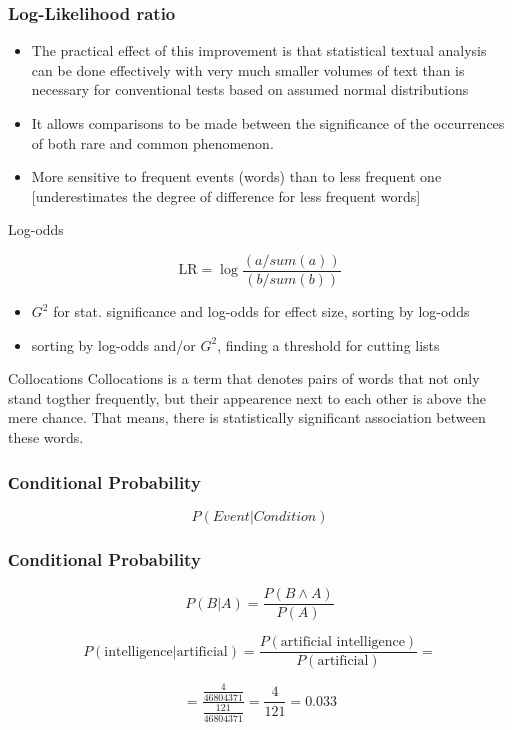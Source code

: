 \documentclass[svgnames]{beamer}
\begin{document}
\begin{frame}
  \frametitle{Log-Likelihood ratio}

  \begin{itemize}
    \item The practical effect of this improvement is that  statistical textual analysis can be done
  effectively with very much smaller volumes of text than is necessary for conventional tests based on assumed normal distributions
  \item It allows comparisons to be made between the significance of the occurrences of both rare and common phenomenon.
  \item More sensitive to frequent events (words) than to less frequent one [underestimates the degree of difference for less frequent words]
  \end{itemize}
\end{frame}

\begin{frame}{Log-odds}

  $$\text{LR} = \log\frac{(a/sum(a))}{(b/sum(b))}$$

\end{frame}


\begin{frame}
  \begin{itemize}
    \item $G^2$ for stat. significance and log-odds for effect size, sorting by log-odds
    \item sorting by log-odds and/or $G^2$, finding a threshold for cutting lists
\end{itemize}
\end{frame}


\begin{frame}{Collocations}
  Collocations is a term that denotes pairs of words that not only stand
togther frequently, but their appearence next to each other is above
the mere chance. That means, there is statistically significant
association between these words.
\end{frame}

\begin{frame}
  \frametitle{Сonditional Probability}
$$
    P(Event|Condition)
$$
\end{frame}

\begin{frame}
  \frametitle{Сonditional Probability}
  \begin{equation}
    P(B|A) = \frac{P(B \land A)}{P(A)}
  \end{equation}

  $$
    P(\text{intelligence}|\text{artificial}) =
    \frac{P(\text{artificial intelligence})}{P(\text{artificial})}
    =$$

    $$
    = \frac{\frac{4}{46804371}}{\frac{121}{46804371}} = \frac{4}{121} = 0.033$$
\end{frame}
\end{document}
